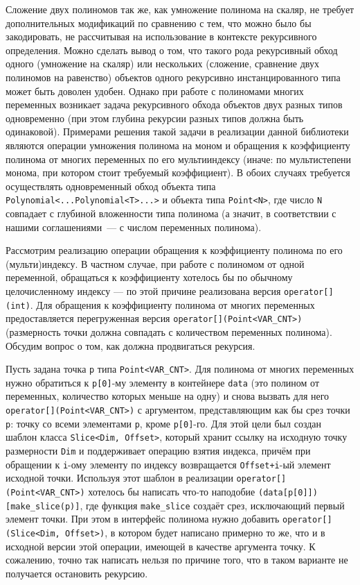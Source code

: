 \documentclass[14pt]{extarticle}
\newcommand{\nspace}{\hspace{0pt}}
\newcommand{\nbdash}{\nobreakdash-\nspace}
\begin{document}
Сложение двух полиномов так же, как умножение полинома на скаляр, не требует
дополнительных модификаций по сравнению с тем, что можно было бы закодировать,
не рассчитывая на использование в контексте рекурсивного определения. Можно сделать
вывод о том, что такого рода рекурсивный обход одного (умножение на скаляр) или
нескольких (сложение, сравнение двух полиномов на равенство) объектов одного
рекурсивно инстанцированного типа может быть доволен удобен. Однако при работе с
полиномами многих переменных возникает задача рекурсивного обхода объектов двух
разных типов одновременно (при этом глубина рекурсии разных типов должна быть
одинаковой). Примерами решения такой задачи в реализации данной библиотеки
являются операции умножения полинома на моном и обращения к коэффициенту полинома
от многих переменных по его мультииндексу (иначе: по мультистепени монома, при
котором стоит требуемый коэффициент). В обоих случаях требуется осуществлять
одновременный обход объекта типа \lstinline$Polynomial<...Polynomial<T>...>$ и
объекта типа \lstinline$Point<N>$, где число \lstinline$N$ совпадает с глубиной
вложенности типа полинома (а значит, в соответствии с нашими соглашениями~— с
числом переменных полинома).

Рассмотрим реализацию операции обращения к коэффициенту полинома по его
(мульти)индексу. В частном случае, при работе с полиномом от одной переменной,
обращаться к коэффициенту хотелось бы по обычному целочисленному индексу — по
этой причине реализована версия \lstinline$operator[](int)$. Для обращения к
коэффициенту полинома от многих переменных предоставляется перегруженная версия
\lstinline$operator[](Point<VAR_CNT>)$ (размерность точки должна
совпадать с количеством переменных полинома). Обсудим вопрос о том, как
должна продвигаться рекурсия. 

Пусть задана точка \lstinline$p$ типа \lstinline$Point<VAR_CNT>$.
Для полинома от многих переменных нужно обратиться к \lstinline$p[0]$\nbdash{}му 
элементу в контейнере \lstinline$data$ (это полином от переменных, количество
которых меньше на одну) и снова вызвать для него
\lstinline$operator[](Point<VAR_CNT>)$ с аргументом, представляющим как бы срез
точки \lstinline$p$: точку со всеми элементами \lstinline$p$, кроме
\lstinline$p[0]$\nbdash{}го. Для этой цели был создан шаблон класса
\lstinline$Slice<Dim, Offset>$, который хранит ссылку на исходную точку
размерности \lstinline$Dim$ и поддерживает операцию взятия индекса, причём при
обращении к \lstinline$i$\nbdash{}ому элементу по индексу возвращается
\lstinline$Offset+i$\nbdash{}ый элемент исходной точки. Используя этот шаблон в
реализации \lstinline$operator[](Point<VAR_CNT>)$ хотелось бы написать что-то
наподобие \lstinline$(data[p[0]])[make_slice(p)]$, где функция
\lstinline$make_slice$ создаёт срез, исключающий первый элемент точки. При этом в
интерфейс полинома нужно добавить \lstinline$operator[](Slice<Dim, Offset>)$, в
котором будет написано примерно то же, что и в исходной версии этой операции,
имеющей в качестве аргумента точку. К сожалению, точно так написать нельзя по
причине того, что в таком варианте не получается остановить рекурсию.
\end{document}
